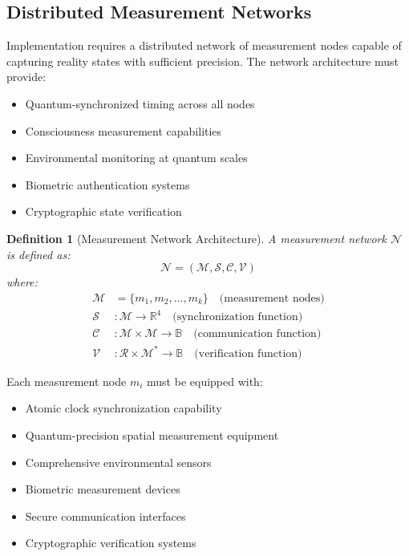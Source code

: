 \documentclass[12pt,a4paper]{article}
\newtheorem{definition}[theorem]{Definition}
\begin{document}
\subsection{Distributed Measurement Networks}

Implementation requires a distributed network of measurement nodes capable of capturing reality states with sufficient precision. The network architecture must provide:

\begin{itemize}
\item Quantum-synchronized timing across all nodes
\item Consciousness measurement capabilities  
\item Environmental monitoring at quantum scales
\item Biometric authentication systems
\item Cryptographic state verification
\end{itemize}

\begin{definition}[Measurement Network Architecture]
A measurement network $\mathcal{N}$ is defined as:
\begin{equation}
\mathcal{N} = (\mathcal{M}, \mathcal{S}, \mathcal{C}, \mathcal{V})
\end{equation}
where:
\begin{align}
\mathcal{M} &= \{m_1, m_2, \ldots, m_k\} \quad \text{(measurement nodes)} \\
\mathcal{S} &: \mathcal{M} \to \mathbb{R}^4 \quad \text{(synchronization function)} \\
\mathcal{C} &: \mathcal{M} \times \mathcal{M} \to \mathbb{B} \quad \text{(communication function)} \\
\mathcal{V} &: \mathcal{R} \times \mathcal{M}^* \to \mathbb{B} \quad \text{(verification function)}
\end{align}
\end{definition}

Each measurement node $m_i$ must be equipped with:
\begin{itemize}
\item Atomic clock synchronization capability
\item Quantum-precision spatial measurement equipment
\item Comprehensive environmental sensors
\item Biometric measurement devices
\item Secure communication interfaces
\item Cryptographic verification systems
\end{itemize}
\end{document}
